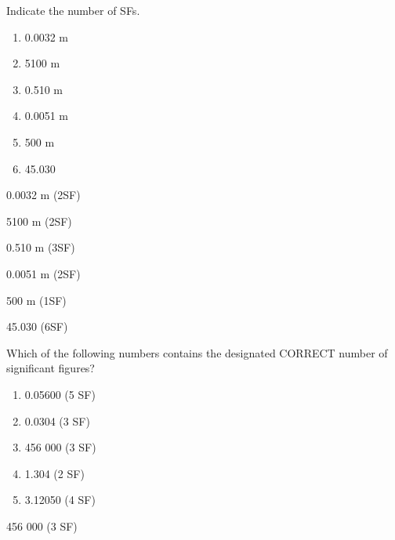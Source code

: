 \documentclass[main.tex]{subfiles}
\begin{document}
\begin{multicols*}{2}
\begin{question}[ID=\the\value{numA}]
Indicate the number of SFs.
\begin{multicols}{2}
  \noindent
  \begin{enumerate} [topsep=0pt, partopsep=1pt, label=(\alph*), leftmargin=1cm]
\item 0.0032 m %
\item 5100 m	%
\item 0.510 m	%
\item 0.0051 m	%
\item 500 m	%
\item 45.030	%
\end{enumerate}
\end{multicols}    
\end{question}
\begin{solution}
\begin{inparaenum}[(a)]
\item 0.0032 m  (2SF)
\item 5100 m	 (2SF)
\item 0.510 m	 (3SF)
\item 0.0051 m	 (2SF)
\item 500 m	 (1SF)
\item 45.030	 (6SF)
\end{inparaenum} 
\hspace{0.1cm}\end{solution}%


\begin{question}[ID=\the\value{numA}]
Which of the following numbers contains the designated CORRECT number of significant figures? 
\begin{multicols}{2}
  \noindent
  \begin{enumerate} [topsep=0pt, partopsep=1pt, label=(\alph*), leftmargin=1cm]
\item 0.05600	 (5 SF)
\item 0.0304 (3 SF)
\item 456 000	 (3 SF)
\item 1.304		(2 SF)
\item 3.12050		(4 SF)
\end{enumerate}
\end{multicols}    
\end{question}
\begin{solution}
456 000	 (3 SF)
\hspace{0.1cm}\end{solution}%



\end{multicols*}
\end{document}
